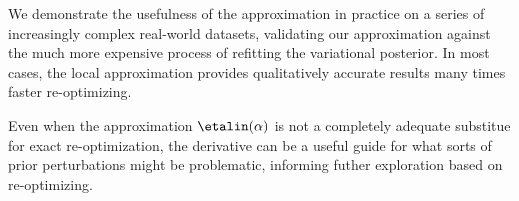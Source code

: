 We demonstrate the usefulness of the approximation in practice on a series of
increasingly complex real-world datasets, validating our approximation against
the much more expensive process of refitting the variational posterior.   In
most cases, the local approximation provides qualitatively accurate results many
times faster re-optimizing.



Even
when the approximation $\etalin(\alpha)$ is not a completely adequate substitue
for exact re-optimization, the derivative can be a useful guide for what sorts
of prior perturbations might be problematic, informing futher exploration based
on re-optimizing.

